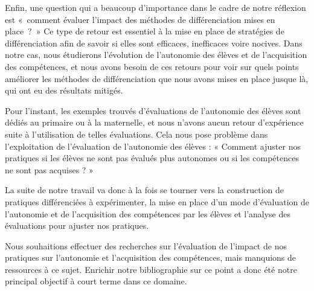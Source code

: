 Enfin, une question qui a beaucoup d’importance dans le cadre de notre réflexion est « comment évaluer l’impact des méthodes de différenciation mises en place ? » Ce type de retour est essentiel à la mise en place de stratégies de différenciation afin de savoir si elles sont efficaces, inefficaces voire nocives. Dans notre cas, nous étudierons l’évolution de l’autonomie des élèves et de l’acquisition des compétences, et nous avons besoin de ces retours pour voir sur quels points améliorer les méthodes de différenciation que nous avons mises en place jusque là, qui ont eu des résultats mitigés.

Pour l’instant, les exemples trouvés d’évaluations de l’autonomie des élèves sont dédiés au primaire ou à la maternelle, et nous n’avons aucun retour d’expérience suite à l’utilisation de telles évaluations. Cela nous pose problème dans l’exploitation de l’évaluation de l’autonomie des élèves : « Comment ajuster nos pratiques si les élèves ne sont pas évalués plus autonomes ou si les compétences ne sont pas acquises ? »

La suite de notre travail va donc à la fois se tourner vers la construction de pratiques différenciées à expérimenter, la mise en place d’un mode d’évaluation de l’autonomie et de l’acquisition des compétences par les élèves et l’analyse des évaluations pour ajuster nos pratiques.

Nous souhaitions effectuer des recherches sur l’évaluation de l’impact de nos pratiques sur l’autonomie et l’acquisition des compétences, mais manquions de ressources à ce sujet. Enrichir notre bibliographie sur ce point a donc été notre principal objectif à court terme dans ce domaine.
